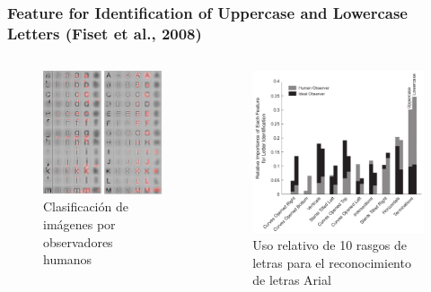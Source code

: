 \documentclass{beamer}
\begin{document}
\begin{frame}
\frametitle{Feature for Identification of Uppercase and Lowercase Letters (Fiset et al., 2008)}

\begin{columns}[t]
  \begin{figure}
    \includegraphics[width=.6\textwidth]{graficos/fiset1.png}
\caption[Fiset et al]{Clasificación de imágenes por observadores humanos}
  \end{figure}
   \begin{figure}
    \includegraphics[width=\textwidth]{graficos/fiset5.png}
\caption{Uso relativo de 10 rasgos de letras para el reconocimiento de letras Arial}
   \end{figure}
\end{columns}

\end{frame}
\end{document}
